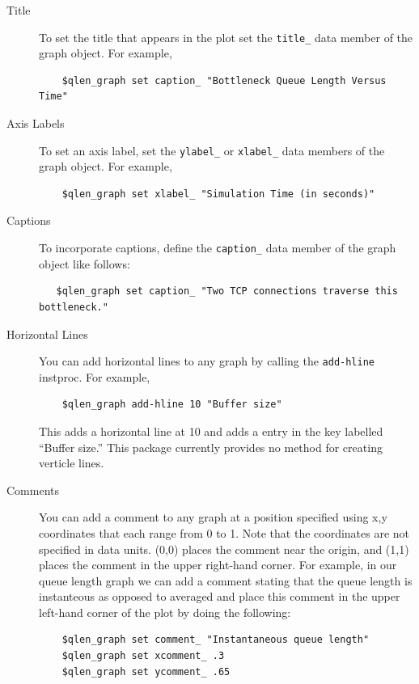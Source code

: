 \documentclass[11pt]{article}
\begin{document}
\begin{description}
\item[Title] {To set the title that appears in the plot set the 
  \verb|title_| data member of the graph object.  For example,}

  \begin{verbatim}
    $qlen_graph set caption_ "Bottleneck Queue Length Versus Time"
  \end{verbatim}

\item[Axis Labels] {To set an axis label, set the \verb|ylabel_| or
   \verb|xlabel_| data members of the graph object.  For example,}

  \begin{verbatim}
    $qlen_graph set xlabel_ "Simulation Time (in seconds)"
  \end{verbatim}

\item[Captions] {To incorporate captions, define the \verb|caption_|
  data member of the graph object like follows:}
  \begin{verbatim}
   $qlen_graph set caption_ "Two TCP connections traverse this bottleneck."
  \end{verbatim}

\item[Horizontal Lines] {You can add horizontal lines to any graph by
  calling the \verb|add-hline| instproc.  For example,}

  \begin{verbatim}
    $qlen_graph add-hline 10 "Buffer size"
  \end{verbatim}

  This adds a horizontal line at 10 and adds a entry in the 
  key labelled ``Buffer size.''  This package currently provides
  no method for creating verticle lines.

\item[Comments] {You can add a comment to any graph at a position
  specified using x,y coordinates that each range from 0 to 1.  Note
  that the coordinates are not specified in data units.  (0,0) places
  the comment near the origin, and (1,1) places the comment in the
  upper right-hand corner.  For example, in our queue length graph we
  can add a comment stating that the queue length is instanteous as
  opposed to averaged and place this comment in the upper left-hand
  corner of the plot by doing the following:}

  \begin{verbatim}
    $qlen_graph set comment_ "Instantaneous queue length"
    $qlen_graph set xcomment_ .3
    $qlen_graph set ycomment_ .65
  \end{verbatim}


\end{description}
\end{document}
